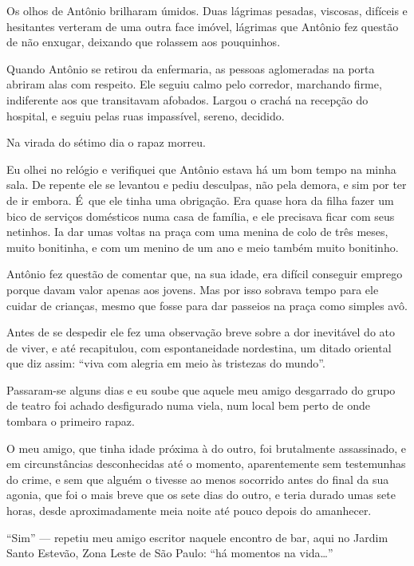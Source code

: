 Os olhos de Antônio brilharam úmidos. Duas lágrimas pesadas, viscosas,
difíceis e hesitantes verteram de uma outra face imóvel, lágrimas que
Antônio fez questão de não enxugar, deixando que rolassem aos
pouquinhos.

Quando Antônio se retirou da enfermaria, as pessoas aglomeradas na porta
abriram alas com respeito. Ele seguiu calmo pelo corredor, marchando
firme, indiferente aos que transitavam afobados. Largou o crachá na
recepção do hospital, e seguiu pelas ruas impassível, sereno, decidido.

Na virada do sétimo dia o rapaz morreu.

\asterisc{}

Eu olhei no relógio e verifiquei que Antônio estava há um bom tempo na
minha sala. De repente ele se levantou e pediu desculpas, não pela demora,
e sim por ter de ir embora. É~que ele tinha uma obrigação. Era quase
hora da filha fazer um bico de serviços domésticos numa casa de família,
e ele precisava ficar com seus netinhos. Ia dar umas voltas na praça com
uma menina de colo de três meses, muito bonitinha, e com um menino de um
ano e meio também muito bonitinho.

Antônio fez questão de comentar que, na sua idade, era difícil conseguir
emprego porque davam valor apenas aos jovens. Mas por isso sobrava tempo
para ele cuidar de crianças, mesmo que fosse para dar passeios na praça
como simples avô.

Antes de se despedir ele fez uma observação breve sobre a dor inevitável
do ato de viver, e até recapitulou, com espontaneidade nordestina, um
ditado oriental que diz assim: ``viva com alegria em meio às tristezas
do mundo''.

\asterisc{}

Passaram-se alguns dias e eu soube que aquele meu amigo desgarrado do
grupo de teatro foi achado desfigurado numa viela, num local bem perto
de onde tombara o primeiro rapaz.

O meu amigo, que tinha idade próxima à do outro, foi brutalmente assassinado,
e em circunstâncias desconhecidas até o momento, aparentemente sem testemunhas do crime, e sem que alguém o tivesse ao menos socorrido antes do final da sua agonia, que foi o mais breve que os sete dias do outro, e teria durado umas sete horas, desde aproximadamente meia noite até pouco depois do amanhecer.

\asterisc{}

``Sim'' --- repetiu meu amigo escritor naquele encontro de bar, aqui no
Jardim Santo Estevão, Zona Leste de São Paulo: ``há momentos na
vida…''

